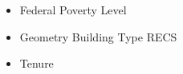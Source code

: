 \begin{itemize}
\item Federal Poverty Level
\item Geometry Building Type RECS
\item Tenure
\end{itemize}
